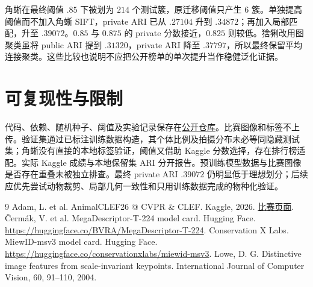 \documentclass[UTF8,a4paper,10pt]{ctexart}
\begin{document}
角蜥在最终阈值 $.85$ 下被划为 $214$ 个测试簇，原迁移阈值只产生 $6$ 簇。单独提高阈值而不加入角蜥 SIFT，private ARI 已从 $.27104$ 升到 $.34872$；再加入局部匹配，升至 $.39072$。$0.85$ 与 $0.875$ 的 private 分数接近，$0.825$ 则较低。猞猁改用图聚类虽将 public ARI 提到 $.31320$，private ARI 降至 $.37797$，所以最终保留平均连接聚类。这些比较也说明不应把公开榜单的单次提升当作稳健泛化证据。

\section{可复现性与限制}
代码、依赖、随机种子、阈值及实验记录保存在\href{https://github.com/Fangwenky/animalclef-2026-reid}{公开仓库}。比赛图像和标签不上传。验证集通过已标注训练数据构造，其个体比例及拍摄分布未必等同隐藏测试集；角蜥没有直接的本地标签验证，阈值又借助 Kaggle 分数选择，存在排行榜适配。实际 Kaggle 成绩与本地保留集 ARI 分开报告。预训练模型数据与比赛图像是否存在重叠未被独立排查。最终 private ARI $.39072$ 仍明显低于理想划分；后续应优先尝试动物裁剪、局部几何一致性和只用训练数据完成的物种化验证。

\begin{thebibliography}{9}
 Adam, L. et al. AnimalCLEF26 @ CVPR \& CLEF. Kaggle, 2026. \href{https://www.kaggle.com/competitions/animal-clef-2026}{比赛页面}.
 \v{C}erm\'ak, V. et al. MegaDescriptor-T-224 model card. Hugging Face. \url{https://huggingface.co/BVRA/MegaDescriptor-T-224}.
 Conservation X Labs. MiewID-msv3 model card. Hugging Face. \url{https://huggingface.co/conservationxlabs/miewid-msv3}.
 Lowe, D. G. Distinctive image features from scale-invariant keypoints. International Journal of Computer Vision, 60, 91--110, 2004.
\end{thebibliography}
\end{document}
